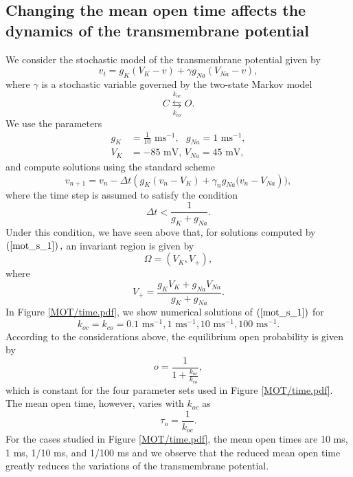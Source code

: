 \subsection[Changing MOT affects the dynamics of the transmembrane potential]{Changing the mean open time affects the dynamics of the transmembrane potential}
We consider the stochastic model of the transmembrane potential given by
\begin{equation}
v_{t}=g_{K}(V_{K}-v)+\gamma g_{Na}(V_{Na}-v) \label{mot_s_1},%
\end{equation}
where $\gamma$ is a stochastic variable governed by the two-state Markov
model
\[
C\underset{k_{co}}{\overset{k_{oc}}{\leftrightarrows}}O.
\]
We use the parameters%
\begin{align}
g_{K}  &  =\frac{1}{10}\text{ ms}^{-1},\text{ }g_{Na}=1\text{ ms}%
^{-1}, \label{mmm_dta}\\
V_{K} &  =-85\text{ mV, }V_{Na}=45\text{ mV,}\nonumber
\end{align}
and compute solutions using the standard scheme
\begin{equation}
v_{n+1}=v_{n}-\Delta t\left(  g_{K}\left(  v_{n}-V_{K}\right)  +\gamma
_{n}g_{Na}(v_{n}-V_{Na}\right)  ), \label{mot_vs}%
\end{equation}
where the time step is assumed to satisfy the condition%
\begin{equation}
\Delta t<\frac{1}{g_{K}+g_{Na}}.
\end{equation}
Under this condition, we have seen above that, for solutions computed by
$\left(  \ref{mot_s_1}\right),  $ an invariant region is given by
\begin{equation}
\Omega=\left(  V_{K},V_{+}\right)  ,
\end{equation}
where%
\[
V_{+}=\frac{g_{K}V_{K}+g_{Na}V_{Na}}{g_{K}+g_{Na}}.
\]
In Figure \ref{MOT/time.pdf}, we show numerical solutions of $\left(  \ref{mot_s_1}\right)  $
for
\[
k_{oc}=k_{co}=0.1\text{ ms}^{-1},1\text{ ms}^{-1}, 10\text{ ms}^{-1}, 100 \text{ ms}^{-1}.
\]
According to the considerations above, the equilibrium open probability is
given by%
\[
o=\frac{1}{1+\frac{k_{oc}}{k_{co}}},%
\]
which is constant for the four parameter sets used in Figure \ref{MOT/time.pdf}. The mean
open time, however, varies with $k_{oc}$ as%
\[
\tau_{o}=\frac{1}{k_{oc}}.
\]
For the cases studied in Figure \ref{MOT/time.pdf}, the mean open times are 
10 ms, 1 ms, 1/10 ms, and 1/100 ms and we observe that the reduced mean open time greatly 
reduces the variations of the transmembrane potential.

